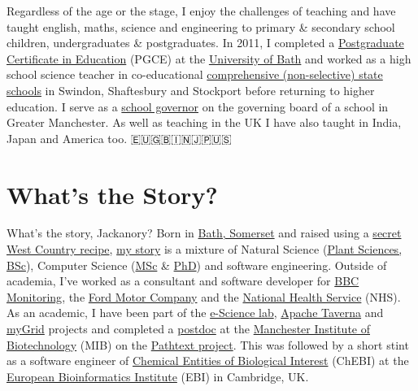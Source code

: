 \documentclass[
  12pt,
]{book}
\begin{document}
Regardless of the age or the stage, I enjoy the challenges of teaching and have taught english, maths, science and engineering to primary \& secondary school children, undergraduates \& postgraduates. In 2011, I completed a \href{https://en.wikipedia.org/wiki/Postgraduate_Certificate_in_Education}{Postgraduate Certificate in Education} (PGCE) at the \href{https://www.bath.ac.uk/}{University of Bath} and worked as a high school science teacher in co-educational \href{https://www.gov.uk/types-of-school}{comprehensive (non-selective) state schools} in Swindon, Shaftesbury and Stockport before returning to higher education. I serve as a \href{https://www.manchester.ac.uk/connect/teachers/school-governors/}{school governor} on the governing board of a school in Greater Manchester. As well as teaching in the UK I have also taught in India, Japan and America too. 🇪🇺🇬🇧🇮🇳🇯🇵🇺🇸

\hypertarget{whats-the-story}{%
\section*{What's the Story?}\label{whats-the-story}}

What's the story, Jackanory? Born in \href{https://en.wikipedia.org/wiki/Bath,_Somerset}{Bath, Somerset} and raised using a \href{https://en.wikipedia.org/wiki/West_Country}{secret West Country recipe}, \href{https://uk.linkedin.com/in/duncanhull}{my story} is a mixture of Natural Science (\href{https://speakerdeck.com/dullhunk/why-study-plants}{Plant Sciences, BSc}), Computer Science (\href{mastersofscience.html}{MSc} \& \href{https://www.librarysearch.manchester.ac.uk/permalink/44MAN_INST/1r887gn/alma992976677936301631}{PhD}) and software engineering. Outside of academia, I've worked as a consultant and software developer for \href{https://en.wikipedia.org/wiki/BBC_Monitoring}{BBC Monitoring}, the \href{https://en.wikipedia.org/wiki/Ford_Motor_Company}{Ford Motor Company} and the \href{https://en.wikipedia.org/wiki/National_Health_Service}{National Health Service} (NHS). As an academic, I have been part of the \href{https://esciencelab.org.uk/}{e-Science lab}, \href{https://en.wikipedia.org/wiki/Apache_Taverna}{Apache Taverna} and \href{https://en.wikipedia.org/wiki/MyGrid}{myGrid} projects and completed a \href{https://en.wikipedia.org/wiki/Postdoctoral_researcher}{postdoc} at the \href{https://www.mib.manchester.ac.uk/}{Manchester Institute of Biotechnology} (MIB) on the \href{https://pubmed.ncbi.nlm.nih.gov/20529930/}{Pathtext project}. This was followed by a short stint as a software engineer of \href{https://en.wikipedia.org/wiki/ChEBI}{Chemical Entities of Biological Interest} (ChEBI) at the \href{https://en.wikipedia.org/wiki/European_Bioinformatics_Institute}{European Bioinformatics Institute} (EBI) in Cambridge, UK. 🧬👨‍🔬
\end{document}
